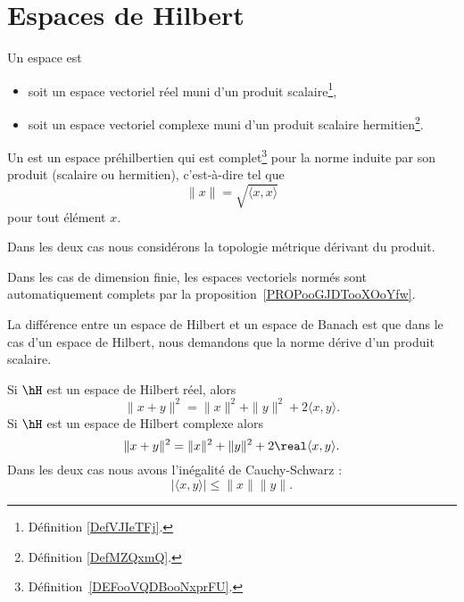
\section{Espaces de Hilbert}


\begin{definition}  \label{DefORuBdBN}
	Un espace  est
	\begin{itemize}
		\item soit un espace vectoriel réel muni d'un produit scalaire\footnote{Définition \ref{DefVJIeTFj}.},
		\item soit un espace vectoriel complexe muni d'un produit scalaire hermitien\footnote{Définition \ref{DefMZQxmQ}.}.
	\end{itemize}
	Un  est un espace préhilbertien qui est complet\footnote{Définition~\ref{DEFooVQDBooNxprFU}.} pour la norme induite par son produit (scalaire ou hermitien), c'est-à-dire tel que
	\begin{equation}
		\| x \|=\sqrt{ \langle x, x\rangle  }
	\end{equation}
	pour tout élément \( x\).

	Dans les deux cas nous considérons la topologie métrique dérivant du produit.
\end{definition}

Dans les cas de dimension finie, les espaces vectoriels normés sont automatiquement complets par la proposition~\ref{PROPooGJDTooXOoYfw}.

La différence entre un espace de Hilbert et un espace de Banach est que dans le cas d'un espace de Hilbert, nous demandons que la norme dérive d'un produit scalaire.

\begin{proposition}     \label{PropTdupIG}
	Si \( \hH\) est un espace de Hilbert réel, alors
	\begin{equation}
		\| x+y \|^2=\| x \|^2+\| y \|^2+2\langle x, y\rangle .
	\end{equation}
	Si \( \hH\) est un espace de Hilbert complexe alors
	\begin{equation}        \label{EqrbBlkK}
		\| x+y \|^2=\| x \|^2+\| y \|^2+2\real\langle x, y\rangle .
	\end{equation}
	Dans les deux cas nous avons l'inégalité de Cauchy-Schwarz :
	\begin{equation}
		| \langle x, y\rangle  |\leq \| x \|\| y \|.
	\end{equation}
\end{proposition}

